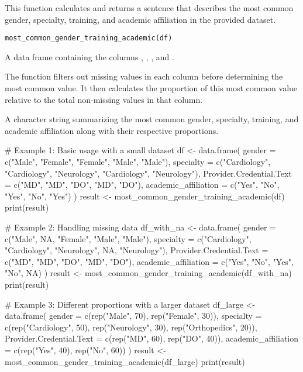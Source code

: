 \documentclass[a4paper]{book}
\begin{document}
%
\begin{Description}
This function calculates and returns a sentence that describes the most common gender, specialty, training, and academic affiliation in the provided dataset.
\end{Description}
%
\begin{Usage}
\begin{verbatim}
most_common_gender_training_academic(df)
\end{verbatim}
\end{Usage}
%
\begin{Arguments}
\begin{ldescription}
\item[\code{df}] A data frame containing the columns , , , and .
\end{ldescription}
\end{Arguments}
%
\begin{Details}
The function filters out missing values in each column before determining the most common value. It then calculates the proportion of this most common value relative to the total non-missing values in that column.
\end{Details}
%
\begin{Value}
A character string summarizing the most common gender, specialty, training, and academic affiliation along with their respective proportions.
\end{Value}
%
\begin{Examples}
\begin{ExampleCode}
# Example 1: Basic usage with a small dataset
df <- data.frame(
  gender = c("Male", "Female", "Female", "Male", "Male"),
  specialty = c("Cardiology", "Cardiology", "Neurology", "Cardiology", "Neurology"),
  Provider.Credential.Text = c("MD", "MD", "DO", "MD", "DO"),
  academic_affiliation = c("Yes", "No", "Yes", "No", "Yes")
)
result <- most_common_gender_training_academic(df)
print(result)

# Example 2: Handling missing data
df_with_na <- data.frame(
  gender = c("Male", NA, "Female", "Male", "Male"),
  specialty = c("Cardiology", "Cardiology", "Neurology", NA, "Neurology"),
  Provider.Credential.Text = c("MD", "MD", "DO", "MD", "DO"),
  academic_affiliation = c("Yes", "No", "Yes", "No", NA)
)
result <- most_common_gender_training_academic(df_with_na)
print(result)

# Example 3: Different proportions with a larger dataset
df_large <- data.frame(
  gender = c(rep("Male", 70), rep("Female", 30)),
  specialty = c(rep("Cardiology", 50), rep("Neurology", 30), rep("Orthopedics", 20)),
  Provider.Credential.Text = c(rep("MD", 60), rep("DO", 40)),
  academic_affiliation = c(rep("Yes", 40), rep("No", 60))
)
result <- most_common_gender_training_academic(df_large)
print(result)

\end{ExampleCode}
\end{Examples}
\end{document}

